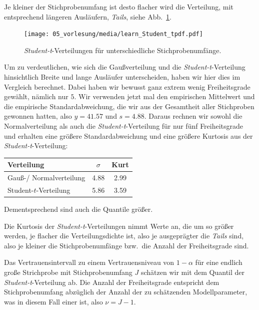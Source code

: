 Je kleiner der Stichprobenumfang ist desto flacher wird die Verteilung, mit entsprechend
längeren Ausläufern, \textsl{Tails}, siehe
Abb.~\ref{studentt}.
\begin{figure}
\begin{center}
\texttt{[image: 05\_vorlesung/media/learn\_Student\_tpdf.pdf]}
\caption{\label{studentt} \textsl{Student-t}-Verteilungen für unterschiedliche Stichprobenumfänge.}
\end{center}
\end{figure}
Um zu verdeutlichen, wie sich die Gaußverteilung und die \textsl{Student-t}-Verteilung hinsichtlich
Breite und lange Ausläufer unterscheiden, haben wir hier dies im Vergleich berechnet.
Dabei haben wir bewusst ganz extrem wenig Freiheitsgrade gewählt, nämlich nur $5$.
Wir verwenden jetzt mal den empirischen Mittelwert und die empirische Standardabweichung,
die wir aus der Gesamtheit aller Stichproben gewonnen hatten, also $y = 41.57$
und $s = 4.88$. Daraus rechnen wir sowohl die Normalverteilung als auch die
\textsl{Student-t}-Verteilung für nur fünf Freiheitsgrade und erhalten eine größere Standardabweichung
und eine größere Kurtosis aus der \textsl{Student-t}-Verteilung:
\begin{center}
\begin{tabular}{l||c|c}
\hline
Verteilung & $\sigma$ & Kurt\\
\hline
Gauß-/ Normalverteilung &   4.88 &  2.99 \\
Student-$t$-Verteilung &  5.86 &  3.59 \\
\hline
\end{tabular}
\end{center}
Dementsprechend sind auch die Quantile größer.


Die Kurtosis der \textsl{Student-t}-Verteilungen nimmt Werte an, die um so größer werden, je flacher die Verteilungsdichte
ist, also je ausgeprägter die \textsl{Tails} sind, also je kleiner die Stichprobenumfänge bzw.\ die
Anzahl der Freiheitsgrade sind.


Das Vertrauensintervall zu einem Vertrauensniveau von $1 - \alpha$ für eine endlich große
Strichprobe mit Stichprobenumfang $J$ schätzen wir mit dem Quantil der \textsl{Student-t}-Verteilung ab.
Die Anzahl der Freiheitsgrade entspricht dem Stichprobenumfang abzüglich der Anzahl der zu
schätzenden Modellparameter, was in diesem Fall einer ist, also $\nu = J - 1$.




